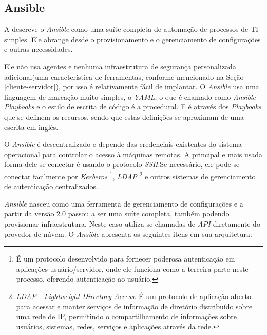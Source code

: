 \subsection{Ansible} \label{Ansible}

A  descreve o \textit{Ansible} como uma suíte completa de automação de processos de TI simples. Ele abrange desde o provisionamento e o gerenciamento de configurações e outras necessidades.

Ele não usa agentes e nenhuma infraestrutura de segurança personalizada adicional(uma característica de ferramentas, conforme mencionado na Seção \ref{cliente-servidor}), por isso é relativamente fácil de implantar. O \textit{Ansible} usa uma linguagem de marcação muito simples, o \textit{YAML}, o que é chamado como \textit{Ansible Playbooks} e o estilo de escrita de código é a procedural. E é através dos \textit{Playbooks} que se definem os recursos, sendo que estas definições se aproximam de uma escrita em inglês. 

O \textit{Ansible} é descentralizado e depende das credenciais existentes do sistema operacional para controlar o acesso à máquinas remotas. A principal e mais usada forma dele se conectar é usando o protocolo \textit{SSH}.Se necessário, ele pode se conectar facilmente por \textit{Kerberos} \footnote{É um protocolo desenvolvido para fornecer poderosa autenticação em aplicações usuário/servidor, onde ele funciona como a terceira parte neste processo, oferendo autenticação ao usuário.}, \textit{LDAP} \footnote{\textit{LDAP - Lightweight Directory Access:} É um protocolo de aplicação aberto para acessar e manter serviços de informação de diretório distribuído sobre uma rede de IP, permitindo o compartilhamento de informações sobre usuários, sistemas, redes, serviços e aplicações através da rede.} e outros sistemas de gerenciamento de autenticação centralizados.


\textit{Ansible} nasceu como uma ferramenta de gerenciamento de configurações e a partir da versão 2.0 passou a ser uma suíte completa, também podendo provisionar infraestrutura. Neste caso utiliza-se chamadas de \textit{API} diretamente do provedor de núvem. O \textit{Ansible} apresenta os seguintes itens em sua arquitetura:

